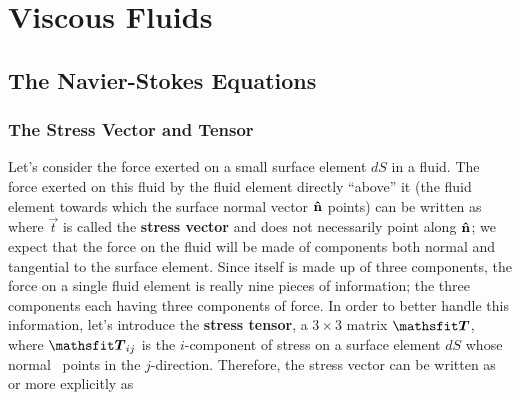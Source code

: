 \documentclass[12pt]{book}
\begin{document}
\chapter{Viscous Fluids}



\section{The Navier-Stokes Equations}
\subsection{The Stress  Vector and Tensor}




Let's consider the force exerted on a small surface element $dS$ in a fluid.  The force exerted on this fluid by the fluid element directly ``above'' it (the fluid element towards which the surface normal vector $\boldsymbol{\hat{\textbf{n}}}$ points) can be written as
where $\vec t$ is called the \textbf{stress vector} and does not necessarily point along $\boldsymbol{\hat{\textbf{n}}}$; we expect that the force on the fluid will be made of components both normal and tangential to the surface element.  Since \nhat itself is made up of three components, the force on a single fluid element is really nine pieces of information; the three \nhat components each having three components of force.  In order to better handle this information, let's introduce the \textbf{stress tensor}, a $3\times 3$ matrix $\tens T$, where $\tens{T}_{ij}$ is the $i$-component of stress on a surface element $dS$ whose normal \nhat\ points in the $j$-direction. Therefore, the stress vector can be written as
or more explicitly as
\end{document}
